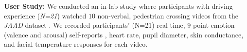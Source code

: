 \documentclass[acmlarge]{acmart}
\begin{document}


\noindent \textbf{User Study:}  
We conducted an in-lab study where participants with driving experience (\textit{N=21}) watched $10$ non-verbal, pedestrian crossing videos from the \textit{JAAD} dataset \cite{2017:IV:rasouli, Ghosh2022}. We recorded participants' (N=21) real-time, 9-point emotion (valence and arousal) self-reports \cite{bradley1994measuring}, heart rate, pupil diameter, skin conductance, and facial temperature responses for each video.
\\
\end{document}
